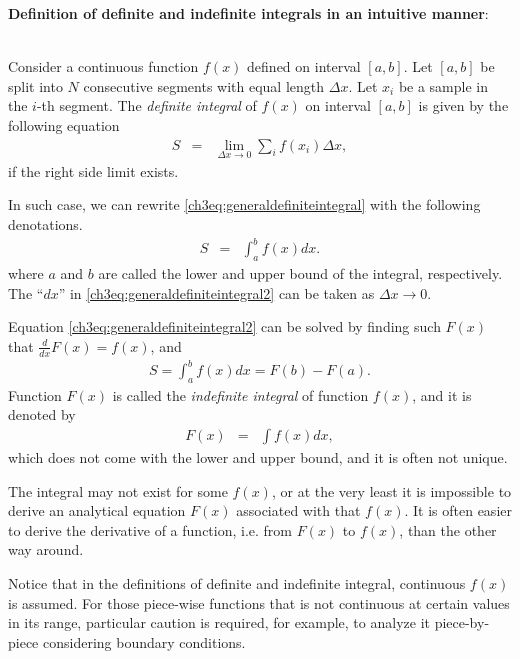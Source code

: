 \begin{VF}
\textbf{Definition of definite and indefinite integrals in an intuitive manner}:
\\
\\
\noindent

Consider a continuous function $f(x)$ defined on interval $[a, b]$. Let $[a, b]$ be split into $N$ consecutive segments with equal length $\Delta x$. Let $x_i$ be a sample in the $i$-th segment. The \textit{definite integral} of $f(x)$ on interval $[a, b]$ is given by the following equation
\begin{eqnarray}
    S &=& \lim_{\Delta x\rightarrow 0} \sum_i f(x_i)\Delta x, \label{ch3eq:generaldefiniteintegral}
\end{eqnarray}
if the right side limit exists.

In such case, we can rewrite \eqref{ch3eq:generaldefiniteintegral} with the following denotations.
\begin{eqnarray}
    S &=& \int_a^b f(x)dx. \label{ch3eq:generaldefiniteintegral2}
\end{eqnarray}
where $a$ and $b$ are called the lower and upper bound of the integral, respectively. The ``$dx$'' in \eqref{ch3eq:generaldefiniteintegral2} can be taken as $\Delta x \rightarrow 0$.

Equation \eqref{ch3eq:generaldefiniteintegral2} can be solved by finding such $F(x)$ that $\frac{d}{dx}F(x) = f(x)$, and
\begin{eqnarray}
    S = \int_a^b f(x)dx = F(b) - F(a). \label{ch3eq:calculatedefiniteintegral}
\end{eqnarray}
Function $F(x)$ is called the \textit{indefinite integral} of function $f(x)$, and it is denoted by
\begin{eqnarray}
    F(x) &=& \int f(x)dx, \nonumber
\end{eqnarray}
which does not come with the lower and upper bound, and it is often not unique.

\end{VF}

The integral may not exist for some $f(x)$, or at the very least it is impossible to derive an analytical equation $F(x)$ associated with that $f(x)$. It is often easier to derive the derivative of a function, i.e. from $F(x)$ to $f(x)$, than the other way around.

Notice that in the definitions of definite and indefinite integral, continuous $f(x)$ is assumed. For those piece-wise functions that is not continuous at certain values in its range, particular caution is required, for example, to analyze it piece-by-piece considering boundary conditions.

